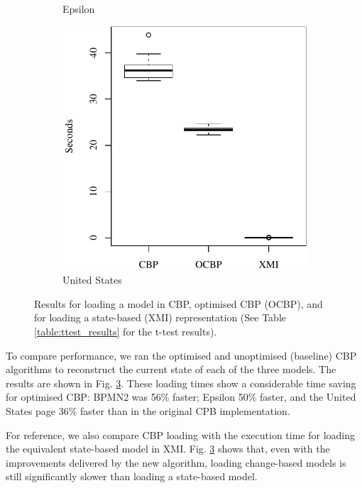 \documentclass{llncs}
\begin{document}
\begin{figure}[ht]
\begin{subfigure}{0.325\textwidth}
    \caption{Epsilon}
    \label{fig:load_time_epsilon}
\end{subfigure}
\hfill
\begin{subfigure}{0.325\textwidth}
    \centering
    \includegraphics[width=\linewidth]{images/load_time_wikipedia}
    \caption{United States}
    \label{fig:load_time_wikipedia}
\end{subfigure}
\caption{Results for loading a model in CBP, optimised CBP (OCBP), and for loading a state-based (XMI) representation (See Table \ref{table:ttest_results} for the t-test results).}
\label{fig:loadtime}
    \end{figure}
    
    To compare performance, we ran the optimised and unoptimised (baseline) CBP algorithms to reconstruct the current state of each of the three  models. The results are shown in Fig. \ref{fig:loadtime}.  These loading times show a considerable time saving for optimised CBP: BPMN2 was 56\% faster; Epsilon 50\% faster, and the United States page 36\% faster than in the original CPB implementation.
    
    For reference, we also compare CBP loading with the execution time for loading the equivalent state-based model in XMI. Fig. \ref{fig:loadtime} shows that, even with the improvements delivered by the new algorithm, loading change-based models is still significantly slower than loading a state-based model.  
    
\end{document}
